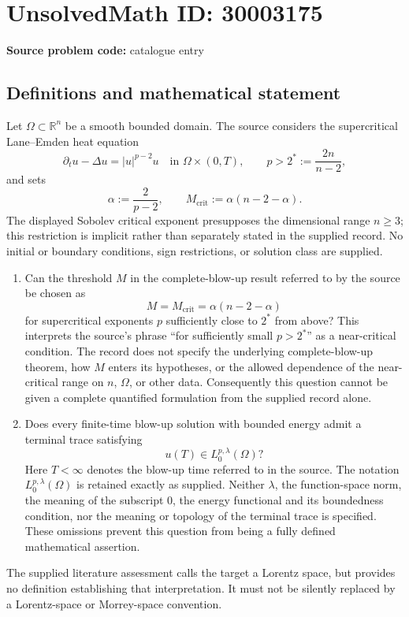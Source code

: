 \documentclass[11pt]{article}
\newcommand{\R}{\mathbb{R}}
\begin{document}
\section*{UnsolvedMath ID: 30003175}
\textbf{Source problem code:} catalogue entry
\subsection{Definitions and mathematical statement}
Let \(\Omega\subset\R^n\) be a smooth bounded domain. The source considers the supercritical Lane--Emden heat equation
\[
\partial_t u-\Delta u=|u|^{p-2}u
\quad\text{in }\Omega\times(0,T),
\qquad p>2^*:=\frac{2n}{n-2},
\]
and sets
\[
\alpha:=\frac{2}{p-2},\qquad M_{\mathrm{crit}}:=\alpha(n-2-\alpha).
\]
The displayed Sobolev critical exponent presupposes the dimensional range \(n\geq3\); this restriction is implicit rather than separately stated in the supplied record. No initial or boundary conditions, sign restrictions, or solution class are supplied.

\begin{enumerate}
\item Can the threshold \(M\) in the complete-blow-up result referred to by the source be chosen as
\[
M=M_{\mathrm{crit}}=\alpha(n-2-\alpha)
\]
for supercritical exponents \(p\) sufficiently close to \(2^*\) from above? This interprets the source's phrase ``for sufficiently small \(p>2^*\)'' as a near-critical condition. The record does not specify the underlying complete-blow-up theorem, how \(M\) enters its hypotheses, or the allowed dependence of the near-critical range on \(n\), \(\Omega\), or other data. Consequently this question cannot be given a complete quantified formulation from the supplied record alone.
\item Does every finite-time blow-up solution with bounded energy admit a terminal trace satisfying
\[
u(T)\in L^{p,\lambda}_0(\Omega)?
\]
Here \(T<\infty\) denotes the blow-up time referred to in the source. The notation \(L^{p,\lambda}_0(\Omega)\) is retained exactly as supplied. Neither \(\lambda\), the function-space norm, the meaning of the subscript \(0\), the energy functional and its boundedness condition, nor the meaning or topology of the terminal trace is specified. These omissions prevent this question from being a fully defined mathematical assertion.
\end{enumerate}
The supplied literature assessment calls the target a Lorentz space, but provides no definition establishing that interpretation. It must not be silently replaced by a Lorentz-space or Morrey-space convention.
\end{document}
